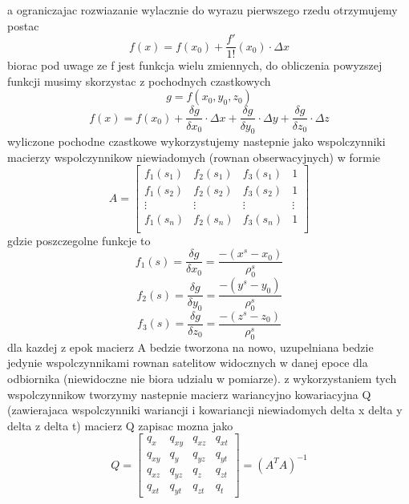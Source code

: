 \documentclass[twocolumn]{article}
\begin{document}
a ograniczajac rozwiazanie wylacznie do wyrazu pierwszego rzedu otrzymujemy postac
\begin{equation}
f(x)=f(x_0)+\frac{f'}{1!}(x_0)\cdot\Delta x
\end{equation}
biorac pod uwage ze f jest funkcja wielu zmiennych, do obliczenia powyzszej funkcji musimy skorzystac z pochodnych czastkowych
\begin{equation}
g = f(x_0,y_0,z_0)
\end{equation}
\begin{equation}
f(x)=f(x_0)+\frac{\delta g}{\delta x_0}\cdot \Delta x+\frac{\delta g}{\delta y_0}\cdot \Delta y+\frac{\delta g}{\delta z_0}\cdot \Delta z
\end{equation}
wyliczone pochodne czastkowe wykorzystujemy nastepnie jako wspolczynniki macierzy wspolczynnikow niewiadomych (rownan obserwacyjnych) w formie
\begin{equation}
A =
\begin{bmatrix} 
  f_1(s_1) & f_2(s_1) & f_3(s_1) & 1\\
  f_1(s_2) & f_2(s_2) & f_3(s_2) & 1\\
  \vdots & \vdots & \vdots & \vdots\\
  f_1(s_n) & f_2(s_n) & f_3(s_n) & 1\\
\end{bmatrix}
\end{equation}
gdzie poszczegolne funkcje to
\begin{equation}
f_1(s) = \frac{\delta g}{\delta x_0} = \frac{-(x^{s}-x_0)}{\rho_0^{s}}
\end{equation}
\begin{equation}
f_2(s) = \frac{\delta g}{\delta y_0} = \frac{-(y^{s}-y_0)}{\rho_0^{s}}
\end{equation}
\begin{equation}
f_3(s) = \frac{\delta g}{\delta z_0} = \frac{-(z^{s}-z_0)}{\rho_0^{s}}
\end{equation}
dla kazdej z epok macierz A bedzie tworzona na nowo, uzupelniana bedzie jedynie wspolczynnikami rownan satelitow widocznych w danej epoce dla odbiornika (niewidoczne nie biora udzialu w pomiarze). z wykorzystaniem tych wspolczynnikow tworzymy nastepnie macierz wariancyjno kowariacyjna Q (zawierajaca wspolczynniki wariancji i kowariancji niewiadomych delta x delta y delta z delta t) macierz Q zapisac mozna jako
\begin{equation}
Q=
\begin{bmatrix}
    q_{x} & q_{xy} & q_{xz} & q_{xt} \\
    q_{xy} & q_{y} & q_{yz} & q_{yt} \\
    q_{xz} & q_{yz} & q_{z} & q_{zt} \\
    q_{xt} & q_{yt} & q_{zt} & q_{t}
\end{bmatrix}
=(A^TA)^{-1}
\end{equation}
\end{document}

